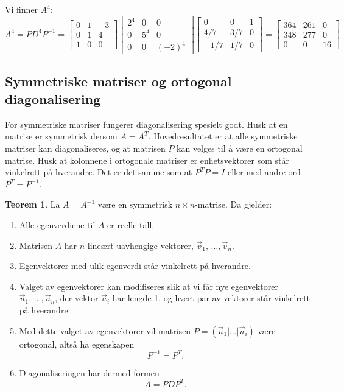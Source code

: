\documentclass[11pt]{article}
\theoremstyle{definition}
\theoremstyle{definition}
\theoremstyle{definition}
\theoremstyle{definition}
\newtheorem{teo}{Teorem}[section]
\newenvironment{fteo}
{\begin{mdframed}[style=minstil]\begin{teo}}
		{\end{teo}\end{mdframed}}
\theoremstyle{definition}
\theoremstyle{definition}
\begin{document}
		Vi finner \(A^4\):
		\[A^4=PD^4P^{-1}=
		\left[\begin{array}{rrr} 
		0 & 1 & -3 \\
		0 & 1 & 4 \\
		1 & 0 & 0
		\end{array} \right]
		\left[\begin{array}{rrr} 
		2^4 & 0 & 0 \\
		0 & 5^4 & 0 \\
		0 & 0 & (-2)^4
		\end{array} \right]
		\left[\begin{array}{rrr} 
		0 & 0 & 1 \\
		4/7 & 3/7 & 0 \\
		-1/7 & 1/7 & 0
		\end{array} \right]
		=
		\left[\begin{array}{rrr} 
		364 & 261 & 0 \\
		348 & 277 & 0 \\
		0 & 0 & 16
		\end{array} \right]
		\]
		
		\newpage 
		
		\subsection{Symmetriske matriser og ortogonal diagonalisering}
		For symmetriske matriser fungerer diagonalisering spesielt godt. Husk at en matrise er symmetrisk dersom \(A=A^T\). Hovedresultatet er at alle symmetriske matriser kan diagonaliseres, og at matrisen \(P\) kan velges til å være en ortogonal matrise. 
		Husk at kolonnene i ortogonale matriser er enhetsvektorer som står vinkelrett på hverandre. Det er det samme som at \(P^TP=I\) eller med andre ord \(P^T=P^{-1}\).
		
		\begin{fteo}
		La \(A=A^{-1}\) være en symmetrisk \(n\times n\)-matrise. Da gjelder:
		\begin{enumerate}
			\item Alle egenverdiene til \(A\) er reelle tall.
			\item Matrisen \(A\) har \(n\) lineært uavhengige vektorer, \(\vec{v}_1,\,\ldots,\vec{v}_n \).
			\item Egenvektorer med ulik egenverdi står vinkelrett på hverandre.
			\item Valget av egenvektorer kan modifiseres slik at vi får nye egenvektorer \(\vec{u}_1,\,\ldots,\vec{u}_n \),
			der vektor \(\vec{u}_i\) har lengde 1, og hvert par av vektorer står vinkelrett på hverandre.
			\item Med dette valget av egenvektorer vil matrisen \(P=(\vec{u}_1|\ldots|\vec{u}_i)\)
			være ortogonal, altså ha egenskapen\[P^{-1}=P^T.\]
			\item Diagonaliseringen har dermed formen \[A=PDP^T.\]
		\end{enumerate}
		\end{fteo}
		
\end{document}
